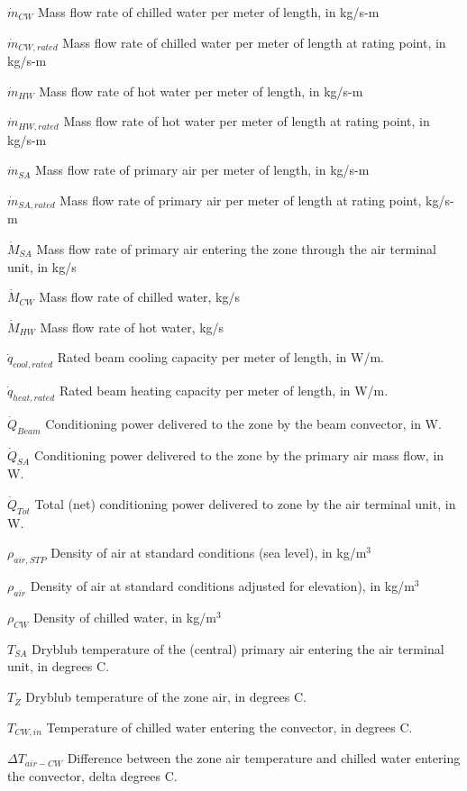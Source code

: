 \({\dot m_{CW}}\) Mass flow rate of chilled water per meter of length, in kg/s-m

\({\dot m_{CW,rated}}\) Mass flow rate of chilled water per meter of length at rating point, in kg/s-m

\({\dot m_{HW}}\) Mass flow rate of hot water per meter of length, in kg/s-m

\({\dot m_{HW,rated}}\) Mass flow rate of hot water per meter of length at rating point, in kg/s-m

\({\dot m_{SA}}\) Mass flow rate of primary air per meter of length, in kg/s-m

\({\dot m_{SA,rated}}\) Mass flow rate of primary air per meter of length at rating point, kg/s-m

\({\dot M_{SA}}\) Mass flow rate of primary air entering the zone through the air terminal unit, in kg/s

\({\dot M_{CW}}\) Mass flow rate of chilled water, kg/s

\({\dot M_{HW}}\) Mass flow rate of hot water, kg/s

\({\dot q_{cool,rated}}\) Rated beam cooling capacity per meter of length, in W/m.

\({\dot q_{heat,rated}}\) Rated beam heating capacity per meter of length, in W/m.

\({\dot Q_{Beam}}\) Conditioning power delivered to the zone by the beam convector, in W.

\({\dot Q_{SA}}\) Conditioning power delivered to the zone by the primary air mass flow, in W.

\({\dot Q_{Tot}}\) Total (net) conditioning power delivered to zone by the air terminal unit, in W.

\({\rho_{air,STP}}\) Density of air at standard conditions (sea level), in kg/m\(^{3}\)

\({\rho_{air}}\) Density of air at standard conditions adjusted for elevation), in kg/m\(^{3}\)

\({\rho_{CW}}\) Density of chilled water, in kg/m\(^{3}\)

\({T_{SA}}\) Dryblub temperature of the (central) primary air entering the air terminal unit, in degrees C.

\({T_{Z}}\) Dryblub temperature of the zone air, in degrees C.

\({T_{CW,in}}\) Temperature of chilled water entering the convector, in degrees C.

\({\Delta T_{air-CW}}\) Difference between the zone air temperature and chilled water entering the convector, delta degrees C.

